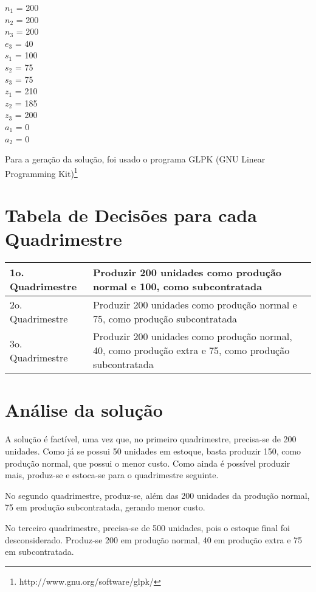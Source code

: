 \documentclass{article}
\begin{document}
$n_1$ = 200 \\
$n_2$ = 200 \\
$n_3$ = 200 \\
$e_3$ = 40 \\
$s_1$ = 100 \\
$s_2$ = 75 \\
$s_3$ = 75 \\
$z_1$ = 210 \\
$z_2$ = 185 \\
$z_3$ = 200 \\
$a_1$ = 0 \\
$a_2$ = 0 \\


\vspace{1cm}

Para a geração da solução, foi usado o programa GLPK (GNU Linear Programming Kit)\footnote{http://www.gnu.org/software/glpk/}


\section{Tabela de Decisões para cada Quadrimestre}

\begin{tabular}{| p{3cm} | p{10cm} |}

\hline
1o. Quadrimestre & Produzir 200 unidades como produção normal e 100, como subcontratada  \\
\hline
2o. Quadrimestre & Produzir 200 unidades como produção normal e 75, como produção subcontratada \\
\hline
3o. Quadrimestre & Produzir 200 unidades como produção normal, 40, como produção extra e 75, como produção subcontratada \\
\hline

\end{tabular}



\section{Análise da solução}

A solução é factível, uma vez que, no primeiro quadrimestre, precisa-se de 200 unidades. Como já se possui 50
unidades em estoque, basta produzir 150, como produção normal, que possui o menor custo. Como ainda é possível 
produzir mais, produz-se e estoca-se para o quadrimestre seguinte.

No segundo quadrimestre, produz-se, além das 200 unidades da produção normal, 75 em produção subcontratada, gerando menor custo.

No terceiro quadrimestre, precisa-se de 500 unidades, pois o estoque final foi desconsiderado.  Produz-se
200 em produção normal, 40 em produção extra e 75 em subcontratada.
\end{document}
